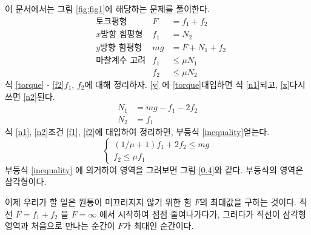 \documentclass[11pt]{article}
\begin{document}
이 문서에서는 그림 \ref{fig:fig1}에 해당하는 문제를 풀이한다.
\begin{align}
& \text{토크평형} & F&=f_{1}+f_{2} \label{torque} \\
& \text{$x$방향 힘평형} & f_{1}&=N_{2} \label{x} \\
& \text{$y$방향 힘평형} & mg&=F+N_{1}+f_{2} \label{y} \\
& \text{마찰계수 고려} & f_{1} &\leq \mu N_{1} \label{f1} \\
& & f_{2} &\leq \mu N_{2} \label{f2}
\end{align}
식 \eqref{torque} - \eqref{f2}\를 $ f_{1} $, $ f_{2} $에 대해 정리하자.
\eqref{y} 에 \eqref{torque}\를 대입하면 식 \eqref{n1}\이 되고, \eqref{x}\를 다시 쓰면 \eqref{n2}\가 된다.
\begin{align}
N_{1} &= mg-f_{1}-2f_{2} \label{n1} \\
N_{2} &= f_{1} \label{n2}
\end{align}
식 \eqref{n1}, \eqref{n2}\를 조건 \eqref{f1}, \eqref{f2}에 대입하여 정리하면, 부등식 \eqref{inequality}\를 얻는다.
\begin{equation} \label{inequality}
\begin{cases}
(1/\mu+1)f_{1}+2f_{2} \leq mg \\
f_{2} \leq \mu f_{1} 
\end{cases}
\end{equation}
부등식 \eqref{inequality} 에 의거하여 영역을 그려보면 그림 \ref{0.4}와 같다. 부등식의 영역은 삼각형이다.

이제 우리가 할 일은 원통이 미끄러지지 않기 위한 힘 $F$의 최대값을 구하는 것이다. 직선 $ F=f_{1}+f_{2} $ 을 $ F=\infty $ 에서 시작하여 점점 줄여나가다가, 그러다가 직선이 삼각형 영역과 처음으로 만나는 순간이 $ F $가 최대인 순간이다.
\end{document}
